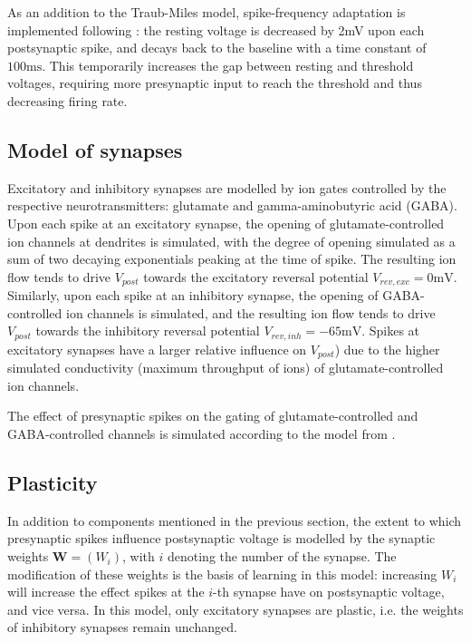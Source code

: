 \documentclass[a4paper,12pt]{report}
\theoremstyle{definition}
\begin{document}
As an addition to the Traub-Miles model, spike-frequency adaptation is implemented following \cite{yeung2004synaptic}: the resting voltage is decreased by 2mV upon each postsynaptic spike, and decays back to the baseline with a time constant of $100\mathrm{ms}$. This temporarily increases the gap between resting and threshold voltages, requiring more presynaptic input to reach the threshold and thus decreasing firing rate.




\subsection{Model of synapses}

Excitatory and inhibitory synapses are modelled by ion gates controlled by the respective neurotransmitters: glutamate and gamma-aminobutyric acid (GABA). Upon each spike at an excitatory synapse, the opening of glutamate-controlled ion channels at dendrites is simulated, with the degree of opening simulated as a sum of two decaying exponentials peaking at the time of spike. The resulting ion flow tends to drive $V_{post}$ towards the excitatory reversal potential $V_{rev,exc}=0\mathrm{mV}$. Similarly, upon each spike at an inhibitory synapse, the opening of GABA-controlled ion channels is simulated, and the resulting ion flow tends to drive $V_{post}$ towards the inhibitory reversal potential $V_{rev,inh}=-65\mathrm{mV}$. Spikes at excitatory synapses have a larger relative influence on $V_{post}$) due to the higher simulated conductivity (maximum throughput of ions) of glutamate-controlled ion channels.

The effect of presynaptic spikes on the gating of glutamate-controlled and GABA-controlled channels is simulated according to the model from \cite{borgers2008gamma}.





\subsection{Plasticity}

In addition to components mentioned in the previous section, the extent to which presynaptic spikes influence postsynaptic voltage is modelled by the synaptic weights $\boldsymbol{W}=(W_i)$, with $i$ denoting the number of the synapse. The modification of these weights is the basis of learning in this model: increasing $W_i$ will increase the effect spikes at the $i$-th synapse have on postsynaptic voltage, and vice versa. In this model, only excitatory synapses are plastic, i.e. the weights of inhibitory synapses remain unchanged.
\end{document}

